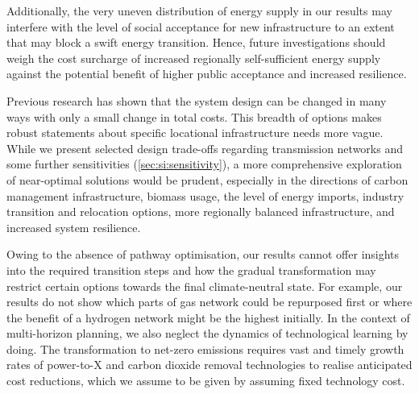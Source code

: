 Additionally, the very uneven distribution of energy supply in our results may
interfere with the level of social acceptance for new infrastructure to an
extent that may block a swift energy transition.
\cite{sasseDistributionalTradeoffs2019,sasseRegionalImpacts2020} Hence, future
investigations should weigh the cost surcharge of increased regionally
self-sufficient energy supply against the potential benefit of higher public
acceptance and increased resilience.

Previous research has shown that the system design can be changed in many ways
with only a small change in total
costs.\cite{Neumann2019,lombardiPolicyDecision2020,pedersenModelingAll2021,pickeringDiversityOptions2022}
This breadth of options makes robust statements about specific locational
infrastructure needs more vague. While we present selected design trade-offs
regarding transmission networks and some further sensitivities
(\cref{sec:si:sensitivity}), a more comprehensive exploration of near-optimal
solutions would be prudent, especially in the directions of carbon management
infrastructure, biomass usage, the level of energy imports, industry transition
and relocation options, more regionally balanced infrastructure, and increased
system resilience.

Owing to the absence of pathway optimisation, our results cannot offer insights
into the required transition steps and how the gradual transformation may
restrict certain options towards the final climate-neutral state. For example,
our results do not show which parts of gas network could be repurposed first or
where the benefit of a hydrogen network might be the highest initially. In the
context of multi-horizon planning, we also neglect the dynamics of technological
learning by
doing.\cite{heubergerPowerCapacity2017,fellingMultihorizonPlanning2022,zeyenEndogenousLearning2022}
The transformation to net-zero emissions requires vast and timely growth rates
of power-to-X and carbon dioxide removal technologies to realise anticipated
cost reductions,\cite{odenwellerProbabilisticFeasibility2022a} which we assume to
be given by assuming fixed technology cost.

